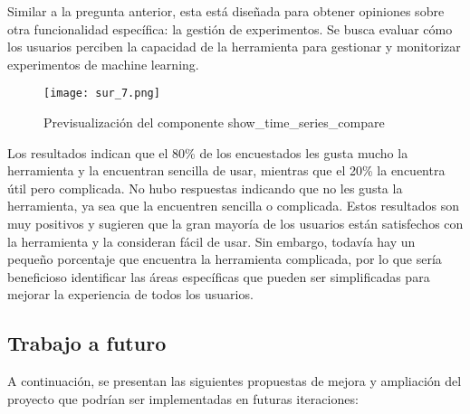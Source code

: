 \begin{itemize}
    Similar a la pregunta anterior, esta está diseñada para obtener opiniones 
    sobre otra funcionalidad específica: la gestión de experimentos. Se busca 
    evaluar cómo los usuarios perciben la capacidad de la herramienta para 
    gestionar y monitorizar experimentos de machine learning.

    \begin{figure}[!h]
        \centering
        \texttt{[image: sur\_7.png]}
        \caption{Previsualización del componente show\_time\_series\_compare}
        \label{fig:sur_7}
    \end{figure}

    Los resultados indican que el 80\% de los encuestados les gusta mucho la 
    herramienta y la encuentran sencilla de usar, mientras que el 20\% la encuentra 
    útil pero complicada. No hubo respuestas indicando que no les gusta la herramienta, 
    ya sea que la encuentren sencilla o complicada. Estos resultados son muy positivos y 
    sugieren que la gran mayoría de los usuarios están satisfechos con la herramienta y 
    la consideran fácil de usar. Sin embargo, todavía hay un pequeño porcentaje que 
    encuentra la herramienta complicada, por lo que sería beneficioso identificar 
    las áreas específicas que pueden ser simplificadas para mejorar la experiencia de 
    todos los usuarios.

\end{itemize}

\subsection{Trabajo a futuro}
A continuación, se presentan las siguientes propuestas de mejora y ampliación
del proyecto que podrían ser implementadas en futuras iteraciones:


